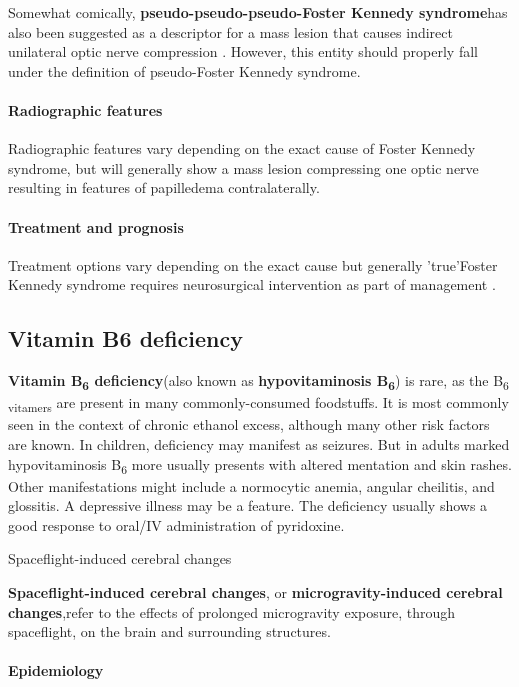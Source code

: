 Somewhat comically, \textbf{pseudo-pseudo-pseudo-Foster Kennedy syndrome}has also been suggested as a descriptor for a mass lesion that causes indirect unilateral optic nerve compression . However, this entity should properly fall under the definition of pseudo-Foster Kennedy syndrome.

\paragraph{Radiographic features}

Radiographic features vary depending on the exact cause of Foster Kennedy syndrome, but will generally show a mass lesion compressing one optic nerve resulting in features of papilledema contralaterally.


\paragraph{Treatment and prognosis}

Treatment options vary depending on the exact cause but generally 'true'Foster Kennedy syndrome requires neurosurgical intervention as part of management .

\subsection{Vitamin B6 deficiency}

\textbf{Vitamin B\textsubscript{6} deficiency}(also known as \textbf{hypovitaminosis B\textsubscript{6}}) is rare, as the B\textsubscript{6 vitamers} are present in many commonly-consumed foodstuffs. It is most commonly seen in the context of chronic ethanol excess, although many other risk factors are known. In children, deficiency may manifest as seizures. But in adults marked hypovitaminosis B\textsubscript{6} more usually presents with altered mentation and skin rashes. Other manifestations might include a normocytic anemia, angular cheilitis, and glossitis. A depressive illness may be a feature. The deficiency usually shows a good response to oral/IV administration of pyridoxine.

Spaceflight-induced cerebral changes

\textbf{Spaceflight-induced cerebral changes}, or \textbf{microgravity-induced cerebral changes},refer to the effects of prolonged microgravity exposure, through spaceflight, on the brain and surrounding structures.

\paragraph{Epidemiology}

